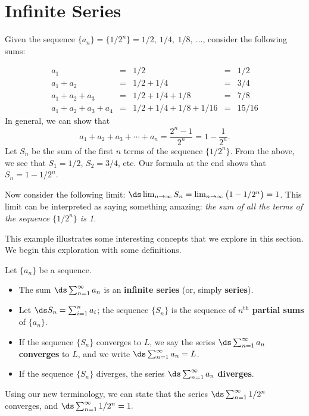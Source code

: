 \section{Infinite Series}\label{sec:series}

Given the sequence $\{a_n\} = \{1/2^n\} = 1/2,\ 1/4,\ 1/8,\ \ldots$, consider the following sums:

$$\begin{array}{ccccc}
a_1				&=& 1/2					 &=& 1/2\\
a_1+a_2		&=& 1/2+1/4			 &=& 3/4\\
a_1+a_2+a_3 &=& 1/2+1/4+1/8  &=& 7/8\\
a_1+a_2+a_3+a_4 &=& 1/2+1/4+1/8+1/16 & =& 15/16
\end{array}$$
In general, we can show that $$a_1+a_2+a_3+\cdots +a_n = \frac{2^n-1}{2^n} = 1-\frac{1}{2^n}.$$
Let $S_n$ be the sum of the first $n$ terms of the sequence $\{1/2^n\}$. From the above, we see that $S_1=1/2$, $S_2 = 3/4$, etc. Our formula at the end shows that $S_n = 1-1/2^n$. 

Now consider the following limit: $\ds \lim_{n\to\infty}S_n = \lim_{n\to\infty}\big(1-1/2^n\big) = 1$. This limit can be interpreted as saying something amazing: \emph{the sum of \emph{all} the terms of the sequence $\{1/2^n\}$ is 1.} 

\enlargethispage{\baselineskip}

This example illustrates some interesting concepts that we explore in this section. We begin this exploration with some definitions.

\setboxwidth{10pt}
{Let $\{a_n\}$ be a sequence.
\begin{itemize}
\item		The sum $\ds \sum_{n=1}^\infty a_n$ is an \textbf{infinite series} (or, simply \textbf{series}).
\item		Let $\ds S_n = \sum_{i=1}^n a_i$; the sequence $\{S_n\}$ is the sequence of \textbf{$n^\text{th}$ partial sums} of $\{a_n\}$.
\item		If the sequence $\{S_n\}$ converges to $L$, we say the series $\ds \sum_{n=1}^\infty a_n$ \textbf{converges} to $L$, and we write $\ds \sum_{n=1}^\infty a_n = L$.
\item		If the sequence $\{S_n\}$ diverges, the series $\ds \sum_{n=1}^\infty a_n$ \textbf{diverges}.
\end{itemize}
}
\restoreboxwidth

Using our new terminology, we can state that the series $\ds \sum_{n=1}^\infty 1/2^n$ converges, and $\ds \sum_{n=1}^\infty 1/2^n = 1.$\\

